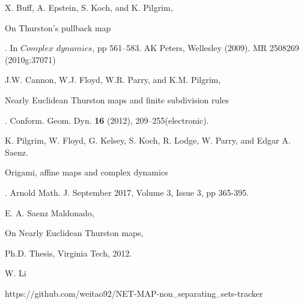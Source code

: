 \documentclass[article,dvisp]{amsart}
\theoremstyle{definition}
\theoremstyle{remark}
\numberwithin{equation}{section}
\theoremstyle{lemma}
\begin{document}
\begin{thebibliography}{99}
 X. Buff, A. Epstein, S. Koch, and K. Pilgrim,\begin{em} On Thurston's pullback map\end{em}. In $Complex$ $dynamics$, pp 561--583. AK Peters, Wellesley (2009). MR 2508269 (2010g:37071)

 J.W. Cannon, W.J. Floyd, W.R. Parry, and K.M. Pilgrim,\begin{em} Nearly Euclidean Thurston maps and finite subdivision rules\end{em}. Conform. Geom. Dyn. \textbf{16} (2012), 209--255(electronic).

  K. Pilgrim, W. Floyd, G. Kelsey,
S. Koch, R. Lodge, W. Parry, and Edgar A. Saenz. \begin{em} Origami, affine maps and complex dynamics \end{em}. Arnold Math. J. September
2017, Volume 3, Issue 3, pp 365-395.

E. A. Saenz Maldonado,\begin{em}On Nearly Euclidean Thurston maps,\end{em} Ph.D. Thesis, Virginia Tech, 2012.

W. Li \begin{em}https://github.com/weitao92/NET-MAP-non$_{-}$separating$_{-}$sets-tracker\end{em}

\end{thebibliography}
\end{document}
